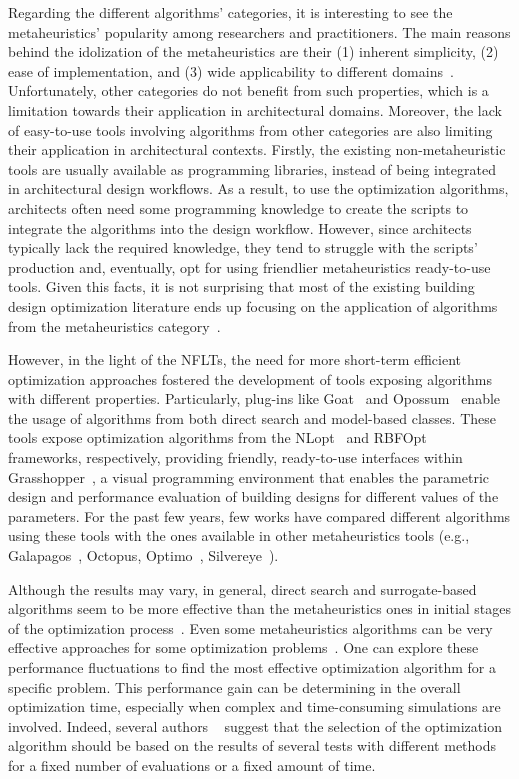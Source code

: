 	Regarding the different algorithms' categories, it is interesting to see the metaheuristics' popularity among researchers and practitioners. The main reasons behind the idolization of the metaheuristics are their (1) inherent simplicity, (2) ease of implementation, and (3) wide applicability to different domains~\cite{Wortmann2017ADO}. Unfortunately, other categories do not benefit from such properties, which is a limitation towards their application in architectural domains. Moreover, the lack of easy-to-use tools involving algorithms from other categories are also limiting their application in architectural contexts. Firstly, the existing non-metaheuristic tools are usually available as programming libraries, instead of being integrated in architectural design workflows. As a result, to use the optimization algorithms, architects often need some programming knowledge to create the scripts to integrate the algorithms into the design workflow. However, since architects typically lack the required knowledge, they tend to struggle with the scripts' production and, eventually, opt for using friendlier metaheuristics ready-to-use tools. Given this facts, it is not surprising that most of the existing building design optimization literature ends up focusing on the application of algorithms from the metaheuristics category~\cite{Hamdy2016,Nguyen2014,Evins2013}. 
	
	However, in the light of the \acp{NFLT}, the need for more short-term efficient optimization approaches fostered the development of tools exposing algorithms with different properties. Particularly, plug-ins like Goat~\cite{GOAT} and Opossum~\cite{Wortmann2017Opossum} enable the usage of algorithms from both direct search and model-based classes. These tools expose optimization algorithms from the NLopt~\cite{NLOPT} and RBFOpt~\cite{RBFOPT} frameworks, respectively, providing friendly, ready-to-use interfaces within Grasshopper~\cite{GRASSHOPPER}, a visual programming environment that enables the parametric design and performance evaluation of building designs for different values of the parameters. For the past few years, few works have compared different algorithms using these tools with the ones available in other metaheuristics tools (e.g., Galapagos~\cite{GALAPAGOS}, Octopus\cite{OCTOPUS}, Optimo~\cite{OPTIMO}, Silvereye~\cite{Cichocka2017SILVEREYE}).
	
	Although the results may vary, in general, direct search and surrogate-based algorithms seem to be more effective than the metaheuristics ones in initial stages of the optimization process~\cite{Wortmann2017,Wortmann2016BBO,Wortmann2017GABESTCHOICE}. Even some metaheuristics algorithms can be very effective approaches for some optimization problems~\cite{Waibel2018}. One can explore these performance fluctuations to find the most effective optimization algorithm for a specific problem. This performance gain can be determining in the overall optimization time, especially when complex and time-consuming simulations are involved. Indeed, several authors ~\cite{Wortmann2016BBO,Hamdy2016} suggest that the selection of the optimization algorithm should be based on the results of several tests with different methods for a fixed number of evaluations or a fixed amount of time. 
	
